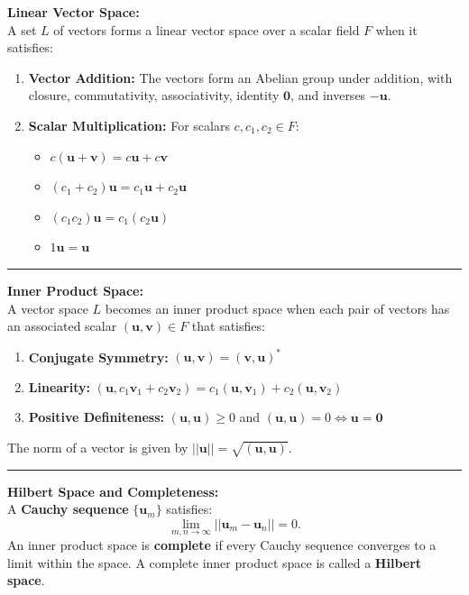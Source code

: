 \documentclass[11pt, a4paper]{report}
\begin{document}
\textbf{Linear Vector Space:} \\
A set $L$ of vectors forms a linear vector space over a scalar field $F$ when it satisfies:
\begin{enumerate}
    \item \textbf{Vector Addition:} The vectors form an Abelian group under addition, with closure, commutativity, associativity, identity $\mathbf{0}$, and inverses $-\mathbf{u}$.
    \item \textbf{Scalar Multiplication:} For scalars $c, c_1, c_2 \in F$:
    \begin{itemize}
        \item $c(\mathbf{u} + \mathbf{v}) = c\mathbf{u} + c\mathbf{v}$
        \item $(c_1 + c_2)\mathbf{u} = c_1\mathbf{u} + c_2\mathbf{u}$
        \item $(c_1 c_2)\mathbf{u} = c_1(c_2\mathbf{u})$
        \item $1\mathbf{u} = \mathbf{u}$
    \end{itemize}
\end{enumerate}

\vspace{1em}
\hrule
\vspace{1em}

\textbf{Inner Product Space:} \\
A vector space $L$ becomes an inner product space when each pair of vectors has an associated scalar $(\mathbf{u}, \mathbf{v}) \in F$ that satisfies:
\begin{enumerate}
    \item \textbf{Conjugate Symmetry:} $(\mathbf{u}, \mathbf{v}) = (\mathbf{v}, \mathbf{u})^*$
    \item \textbf{Linearity:} $(\mathbf{u}, c_1\mathbf{v}_1 + c_2\mathbf{v}_2) = c_1(\mathbf{u}, \mathbf{v}_1) + c_2(\mathbf{u}, \mathbf{v}_2)$
    \item \textbf{Positive Definiteness:} $(\mathbf{u}, \mathbf{u}) \ge 0$ and $(\mathbf{u}, \mathbf{u}) = 0 \iff \mathbf{u} = \mathbf{0}$
\end{enumerate}
The norm of a vector is given by $||\mathbf{u}|| = \sqrt{(\mathbf{u}, \mathbf{u})}$.

\vspace{1em}
\hrule
\vspace{1em}

\textbf{Hilbert Space and Completeness:} \\
A \textbf{Cauchy sequence} $\{\mathbf{u}_m\}$ satisfies:
\[ \lim_{m,n \to \infty} ||\mathbf{u}_m - \mathbf{u}_n|| = 0. \]
An inner product space is \textbf{complete} if every Cauchy sequence converges to a limit within the space. A complete inner product space is called a \textbf{Hilbert space}.
\end{document}
